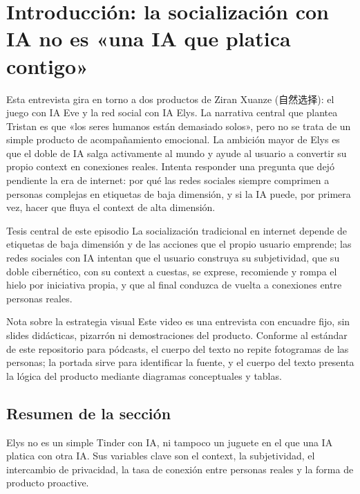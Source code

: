 \section{Introducción: la socialización con IA no es «una IA que platica contigo»}

Esta entrevista gira en torno a dos productos de Ziran Xuanze (自然选择): el juego con IA Eve y la red social con IA Elys. La narrativa central que plantea Tristan es que «los seres humanos están demasiado solos», pero no se trata de un simple producto de acompañamiento emocional. La ambición mayor de Elys es que el doble de IA salga activamente al mundo y ayude al usuario a convertir su propio context en conexiones reales. Intenta responder una pregunta que dejó pendiente la era de internet: por qué las redes sociales siempre comprimen a personas complejas en etiquetas de baja dimensión, y si la IA puede, por primera vez, hacer que fluya el context de alta dimensión.

\begin{importantbox}{Tesis central de este episodio}
La socialización tradicional en internet depende de etiquetas de baja dimensión y de las acciones que el propio usuario emprende; las redes sociales con IA intentan que el usuario construya su subjetividad, que su doble cibernético, con su context a cuestas, se exprese, recomiende y rompa el hielo por iniciativa propia, y que al final conduzca de vuelta a conexiones entre personas reales.
\end{importantbox}

\begin{knowledgebox}{Nota sobre la estrategia visual}
Este video es una entrevista con encuadre fijo, sin slides didácticas, pizarrón ni demostraciones del producto. Conforme al estándar de este repositorio para pódcasts, el cuerpo del texto no repite fotogramas de las personas; la portada sirve para identificar la fuente, y el cuerpo del texto presenta la lógica del producto mediante diagramas conceptuales y tablas.
\end{knowledgebox}

\subsection{Resumen de la sección}

Elys no es un simple Tinder con IA, ni tampoco un juguete en el que una IA platica con otra IA. Sus variables clave son el context, la subjetividad, el intercambio de privacidad, la tasa de conexión entre personas reales y la forma de producto proactive.
